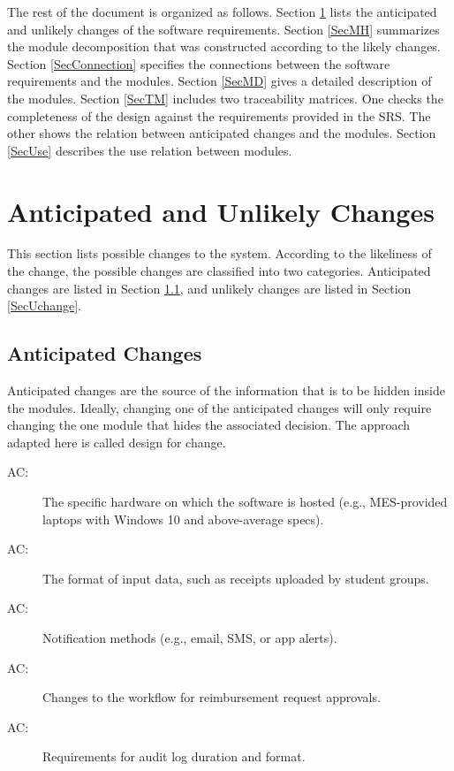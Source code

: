\documentclass[12pt, titlepage]{article}
\newcounter{acnum}
\newcommand{\actheacnum}{AC\theacnum}
\begin{document}
The rest of the document is organized as follows. Section
\ref{SecChange} lists the anticipated and unlikely changes of the software
requirements. Section \ref{SecMH} summarizes the module decomposition that
was constructed according to the likely changes. Section \ref{SecConnection}
specifies the connections between the software requirements and the
modules. Section \ref{SecMD} gives a detailed description of the
modules. Section \ref{SecTM} includes two traceability matrices. One checks
the completeness of the design against the requirements provided in the SRS. The
other shows the relation between anticipated changes and the modules. Section
\ref{SecUse} describes the use relation between modules.

\section{Anticipated and Unlikely Changes} \label{SecChange}

This section lists possible changes to the system. According to the likeliness
of the change, the possible changes are classified into two
categories. Anticipated changes are listed in Section \ref{SecAchange}, and
unlikely changes are listed in Section \ref{SecUchange}.

\subsection{Anticipated Changes} \label{SecAchange}

Anticipated changes are the source of the information that is to be hidden
inside the modules. Ideally, changing one of the anticipated changes will only
require changing the one module that hides the associated decision. The approach
adapted here is called design for
change.

\begin{description}
\item[ \actheacnum \label{acHardware}:] The specific
  hardware on which the software is hosted (e.g., MES-provided laptops with Windows 10 and above-average specs).
\item[ \actheacnum \label{acInput}:] The format of input data, such as receipts uploaded by student groups.
\item[ \actheacnum \label{acNotifications}:] Notification methods (e.g., email, SMS, or app alerts).
\item[ \actheacnum \label{acWorkflow}:] Changes to the workflow for reimbursement request approvals.
\item[ \actheacnum \label{acAudit}:] Requirements for audit log duration and format.
\end{description}
\end{document}
